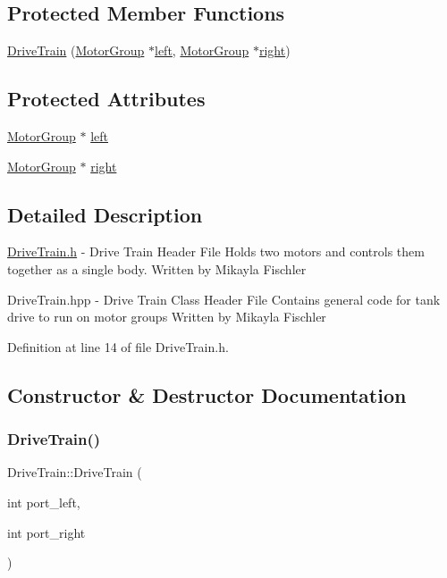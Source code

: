 \subsection*{Protected Member Functions}
\begin{DoxyCompactItemize}
\item 
\hyperlink{class_drive_train_a82ca6f487a43e353aea5ee1ff49952da}{Drive\+Train} (\hyperlink{class_motor_group}{Motor\+Group} $\ast$\hyperlink{class_drive_train_a8343c1e4fad9e5c7e68e627f592e52ea}{left}, \hyperlink{class_motor_group}{Motor\+Group} $\ast$\hyperlink{class_drive_train_a1fe3a54242798b1b88eb437c7c7cf9ad}{right})
\end{DoxyCompactItemize}
\subsection*{Protected Attributes}
\begin{DoxyCompactItemize}
\item 
\hyperlink{class_motor_group}{Motor\+Group} $\ast$ \hyperlink{class_drive_train_a8343c1e4fad9e5c7e68e627f592e52ea}{left}
\item 
\hyperlink{class_motor_group}{Motor\+Group} $\ast$ \hyperlink{class_drive_train_a1fe3a54242798b1b88eb437c7c7cf9ad}{right}
\end{DoxyCompactItemize}


\subsection{Detailed Description}
\hyperlink{_drive_train_8h}{Drive\+Train.\+h} -\/ Drive Train Header File Holds two motors and controls them together as a single body. Written by Mikayla Fischler

Drive\+Train.\+hpp -\/ Drive Train Class Header File Contains general code for tank drive to run on motor groups Written by Mikayla Fischler 

Definition at line 14 of file Drive\+Train.\+h.



\subsection{Constructor \& Destructor Documentation}
\mbox{\label{class_drive_train_a7c4f19e864e8be8bce01466ee876ad83}} 
\subsubsection{\texorpdfstring{Drive\+Train()}{DriveTrain()}\hspace{0.1cm}{\footnotesize\ttfamily [1/2]}}
{\footnotesize\ttfamily Drive\+Train\+::\+Drive\+Train (\begin{DoxyParamCaption}\item[{int}]{port\+\_\+left,  }\item[{int}]{port\+\_\+right }\end{DoxyParamCaption})}

